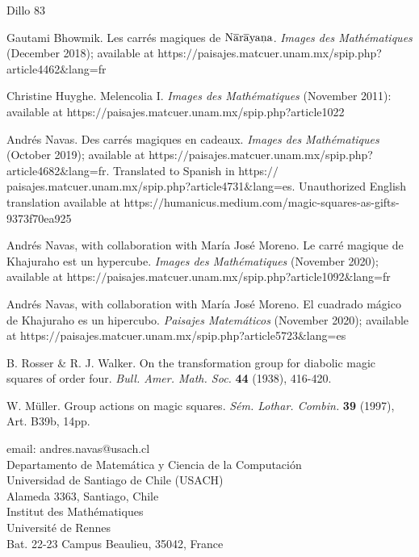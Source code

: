 \documentclass[11pt,a4paper]{article}
\begin{document}
\begin{footnotesize}

\begin{thebibliography}{Dillo 83}

 {\sc Gautami Bhowmik.} 
Les carrés magiques de $\mathrm{N\overline{a}r\overline{a}ya\underaccent{.}na}$. 
{\em Images des Mathématiques} (December 2018); available at 
https:$/\!/$paisajes.matcuer.unam.mx/spip.php?article4462$\&$lang=fr

 {\sc Christine Huyghe.} 
Melencolia I. {\em Images des Math\'ematiques} (November 2011): 
available at https:$/\!/$paisajes.matcuer.unam.mx/spip.php?article1022

 {\sc Andrés Navas.} 
Des carrés magiques en cadeaux. {\em Images des Mathématiques} (October 2019); available at 
https:$//$paisajes.matcuer.unam.mx/spip.php?article4682$\&$lang=fr. Translated to Spanish in 
https:$/\!/$paisajes.matcuer.unam.mx/spip.php?article4731$\&$lang=es. Unauthorized English 
translation available at https:$/\!/$humanicus.medium.com/magic-squares-as-gifts-9373f70ea925

 {\sc Andrés Navas,} with collaboration with {\sc María José Moreno.}  
Le carré magique de Khajuraho est un hypercube.
{\em Images des Math\'ematiques} (November 2020); available at  
https:$/\!/$paisajes.matcuer.unam.mx/spip.php?article1092$\&$lang=fr

 {\sc Andrés Navas,} with collaboration with {\sc María José Moreno.}  
El cuadrado mágico de Khajuraho es un hipercubo. 
{\em Paisajes Matemáticos} (November 2020); available at 
https:$/\!/$paisajes.matcuer.unam.mx/spip.php?article5723$\&$lang=es

 {\sc B. Rosser \& R. J. Walker.} 
On the transformation group for diabolic magic squares of order four. 
{\em Bull. Amer. Math. Soc.} {\bf 44} (1938), 416-420.

 {\sc W. Müller.} 
Group actions on magic squares. 
{\em S\'em. Lothar. Combin.} {\bf 39} (1997), Art. B39b, 14pp. 

 \end{thebibliography}

\vspace{0.5cm}

\noindent email: andres.navas@usach.cl\\

\noindent Departamento de Matem\'atica y Ciencia de la Computaci\'on\\
\noindent Universidad de Santiago de Chile (USACH)\\ 
\noindent Alameda 3363, Santiago, Chile\\ 

\noindent Institut des Mathématiques\\
Université de Rennes\\
Bat. 22-23 Campus Beaulieu, 35042, France\\

\end{footnotesize}
\end{document}
